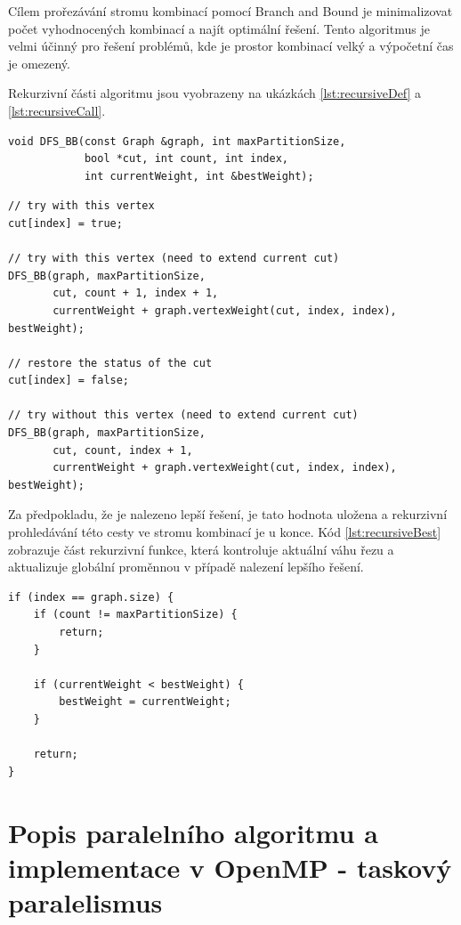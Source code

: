 \documentclass[epsf,epic,eepic,eepicemu]{article}\oddsidemargin=-5mm
\begin{document}
Cílem prořezávání stromu kombinací pomocí Branch and Bound je minimalizovat počet vyhodnocených kombinací a najít optimální řešení. Tento algoritmus je velmi účinný pro řešení problémů, kde je prostor kombinací velký a výpočetní čas je omezený. \cite{coursesPDPBFS}

Rekurzivní části algoritmu jsou vyobrazeny na ukázkách \ref{lst:recursiveDef} a \ref{lst:recursiveCall}.

\begin{lstlisting}[float,label=lst:recursiveDef, caption={Prototyp rekurzivní funkce}]
void DFS_BB(const Graph &graph, int maxPartitionSize,
            bool *cut, int count, int index,
            int currentWeight, int &bestWeight);
\end{lstlisting}

\begin{lstlisting}[float,label=lst:recursiveCall, caption={Rekurzivní volání}]
// try with this vertex
cut[index] = true;

// try with this vertex (need to extend current cut)
DFS_BB(graph, maxPartitionSize,
       cut, count + 1, index + 1,
       currentWeight + graph.vertexWeight(cut, index, index), bestWeight);

// restore the status of the cut
cut[index] = false;

// try without this vertex (need to extend current cut)
DFS_BB(graph, maxPartitionSize,
       cut, count, index + 1,
       currentWeight + graph.vertexWeight(cut, index, index), bestWeight);
\end{lstlisting}

Za předpokladu, že je nalezeno lepší řešení, je tato hodnota uložena a rekurzivní prohledávání této cesty ve stromu kombinací je u konce. Kód \ref{lst:recursiveBest} zobrazuje část rekurzivní funkce, která kontroluje aktuální váhu řezu a aktualizuje globální proměnnou v případě nalezení lepšího řešení.

\begin{lstlisting}[float,label=lst:recursiveBest, caption={Prototyp rekurzivní funkce}]
if (index == graph.size) {
    if (count != maxPartitionSize) {
        return;
    }

    if (currentWeight < bestWeight) {
        bestWeight = currentWeight;
    }
    
    return;
}
\end{lstlisting}

\section{Popis paralelního algoritmu a implementace v OpenMP - taskový paralelismus}
\end{document}
